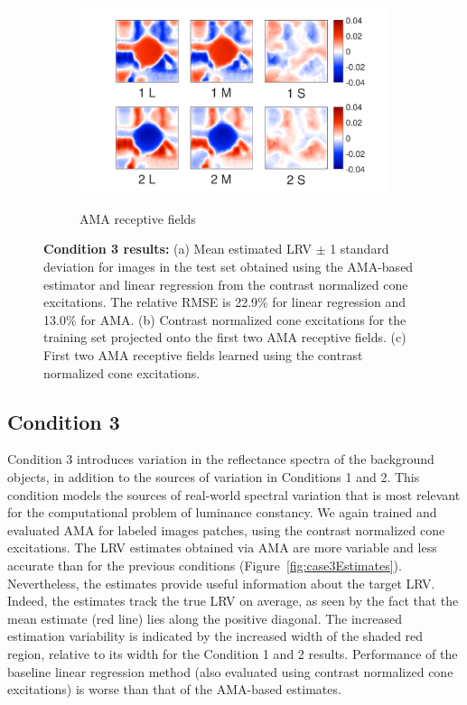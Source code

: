 \documentclass{jov}
\begin{document}
\begin{figure}
\begin{subfigure}[b]{0.26\textwidth}
        \label{fig:case3RFResponse}
    \end{subfigure}
    \begin{subfigure}[b]{0.4 \textwidth}
	\caption{AMA receptive fields}
	\includegraphics[width=1.0\textwidth, trim={0.2cm -0.cm 0 0.3cm}]{../FiguresDraft5/Figure12/Figure12_c.pdf}
	\label{fig:case3RFs}
    \end{subfigure}
    \caption{{\bf Condition 3 results:} (a) Mean estimated LRV $\pm$ 1 standard deviation for images in the test set obtained using the AMA-based estimator and linear regression from the contrast normalized cone excitations. The relative RMSE is 22.9\%  for linear regression and 13.0\% for AMA. (b) Contrast normalized cone excitations for the training set projected onto the first two AMA receptive fields. (c) First two AMA receptive fields learned using the contrast normalized cone excitations.}
\label{fig:Condition3}
\end{figure}

\subsection{Condition 3}

Condition 3 introduces variation in the reflectance spectra of the background objects, in addition to the sources of variation in Conditions 1 and 2.
This condition models the sources of real-world spectral variation that is most relevant for the computational problem of luminance constancy.
We again trained and evaluated AMA for labeled images patches, using the contrast normalized cone excitations.
The LRV estimates obtained via AMA are more variable and less accurate than for the previous conditions (Figure~\ref{fig:case3Estimates}).
Nevertheless, the estimates provide useful information about the target LRV.
Indeed, the estimates track the true LRV on average, as seen by the fact that the mean estimate (red line) lies along the positive diagonal.
The increased estimation variability is indicated by the increased width of the shaded red region, relative to its width for the Condition 1 and 2 results.
Performance of the baseline linear regression method (also evaluated using contrast normalized cone excitations) is worse than that of the AMA-based estimates.
\end{document}
